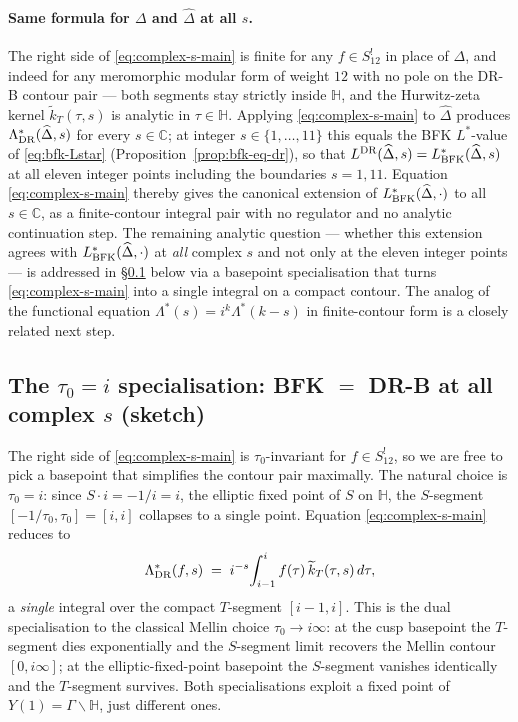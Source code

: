 \documentclass[11pt,letterpaper]{article}
\newcommand{\HH}{\mathbb{H}}
\newcommand{\CC}{\mathbb{C}}
\newcommand{\Dhat}{\widehat{\Delta}}
\begin{document}
\paragraph{Same formula for $\Delta$ and $\Dhat$ at all $s$.}
The right side of \eqref{eq:complex-s-main} is finite for any $f \in S_{12}^!$ in place of $\Delta$, and indeed for any meromorphic modular form of weight $12$ with no pole on the DR-B contour pair --- both segments stay strictly inside $\HH$, and the Hurwitz-zeta kernel $\widetilde{k}_T(\tau, s)$ is analytic in $\tau \in \HH$.  Applying \eqref{eq:complex-s-main} to $\Dhat$ produces $\Lambda^*_{\rm DR}(\Dhat, s)$ for every $s \in \CC$; at integer $s \in \{1, \ldots, 11\}$ this equals the BFK $L^*$-value of \eqref{eq:bfk-Lstar} (Proposition~\ref{prop:bfk-eq-dr}), so that $L^{\rm DR}(\Dhat, s) = L^*_{\rm BFK}(\Dhat, s)$ at all eleven integer points including the boundaries $s = 1, 11$.  Equation \eqref{eq:complex-s-main} thereby gives the canonical extension of $L^*_{\rm BFK}(\Dhat, \cdot)$ to all $s \in \CC$, as a finite-contour integral pair with no regulator and no analytic continuation step.  The remaining analytic question --- whether this extension agrees with $L^*_{\rm BFK}(\Dhat, \cdot)$ at \emph{all} complex $s$ and not only at the eleven integer points --- is addressed in \S\ref{subsec:tau0-i} below via a basepoint specialisation that turns \eqref{eq:complex-s-main} into a single integral on a compact contour.  The analog of the functional equation $\Lambda^*(s) = i^k\Lambda^*(k - s)$ in finite-contour form is a closely related next step.

\subsection{The $\tau_0 = i$ specialisation: BFK $=$ DR-B at all complex $s$ (sketch)}\label{subsec:tau0-i}

The right side of \eqref{eq:complex-s-main} is $\tau_0$-invariant for $f \in S_{12}^!$, so we are free to pick a basepoint that simplifies the contour pair maximally.  The natural choice is $\tau_0 = i$: since $S \cdot i = -1/i = i$, the elliptic fixed point of $S$ on $\HH$, the $S$-segment $[-1/\tau_0, \tau_0] = [i, i]$ collapses to a single point.  Equation \eqref{eq:complex-s-main} reduces to
\begin{equation}\label{eq:tau0-i-formula}
\Lambda^*_{\rm DR}(f, s) \;=\; i^{-s}\!\int_{i-1}^{i} f(\tau)\,\widetilde{k}_T(\tau, s)\,d\tau,
\end{equation}
a \emph{single} integral over the compact $T$-segment $[i-1, i]$.  This is the dual specialisation to the classical Mellin choice $\tau_0 \to i\infty$: at the cusp basepoint the $T$-segment dies exponentially and the $S$-segment limit recovers the Mellin contour $[0, i\infty]$; at the elliptic-fixed-point basepoint the $S$-segment vanishes identically and the $T$-segment survives.  Both specialisations exploit a fixed point of $Y(1) = \Gamma\backslash\HH$, just different ones.
\end{document}
